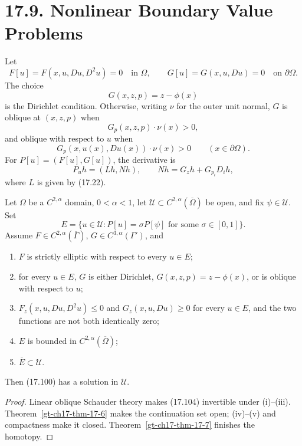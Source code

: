 \section*{17.9. Nonlinear Boundary Value Problems}

Let
\begin{equation}\tag{17.100}
F[u]=F(x,u,Du,D^2u)=0\quad\text{in }\Omega,
\qquad G[u]=G(x,u,Du)=0\quad\text{on }\partial\Omega.
\end{equation}
The choice
\begin{equation}
\tag{17.101}
G(x,z,p)=z-\phi(x)
\end{equation}
is the Dirichlet condition. Otherwise, writing $\nu$ for the outer unit
normal, $G$ is oblique at $(x,z,p)$ when
\begin{equation}\tag{17.102}
G_p(x,z,p)\cdot\nu(x)>0,
\end{equation}
and oblique with respect to $u$ when
\begin{equation}
\tag{17.103}
G_p(x,u(x),Du(x))\cdot\nu(x)>0
\qquad(x\in\partial\Omega).
\end{equation}
For
$P[u]=(F[u],G[u])$, the derivative is
\begin{equation}\tag{17.104}
P_uh=(Lh,Nh),
\qquad Nh=G_zh+G_{p_i}D_i h,
\end{equation}
where $L$ is given by (17.22).

\begin{theorem}
\label{gt-ch17-thm-continuity-nonlinear-boundary-operators}
Let $\Omega$ be a $C^{2,\alpha}$ domain, $0<\alpha<1$, let
$\mathcal U\subset C^{2,\alpha}(\overline\Omega)$ be open, and fix
$\psi\in\mathcal U$.  Set
\begin{equation}\tag{17.105}
E=\{u\in\mathcal U:P[u]=\sigma P[\psi]
\text{ for some }\sigma\in[0,1]\}.
\end{equation}
Assume $F\in C^{2,\alpha}(\overline\Gamma)$,
$G\in C^{3,\alpha}(\Gamma')$, and
\begin{enumerate}
\item[(i)] $F$ is strictly elliptic with respect to every $u\in E$;
\item[(ii)] for every $u\in E$, $G$ is either Dirichlet,
$G(x,z,p)=z-\phi(x)$, or is oblique with respect to $u$;
\item[(iii)] $F_z(x,u,Du,D^2u)\le0$ and $G_z(x,u,Du)\ge0$ for every
$u\in E$, and the two functions are not both identically zero;
\item[(iv)] $E$ is bounded in $C^{2,\alpha}(\overline\Omega)$;
\item[(v)] $\overline E\subset\mathcal U$.
\end{enumerate}
Then (17.100) has a solution in $\mathcal U$.
\end{theorem}
\begin{proof}
\sketch Linear oblique Schauder theory makes (17.104) invertible under
(i)--(iii).  Theorem~\ref{gt-ch17-thm-17-6} makes the continuation set open;
(iv)--(v) and compactness make it closed.
Theorem~\ref{gt-ch17-thm-17-7} finishes the homotopy.
\end{proof}

